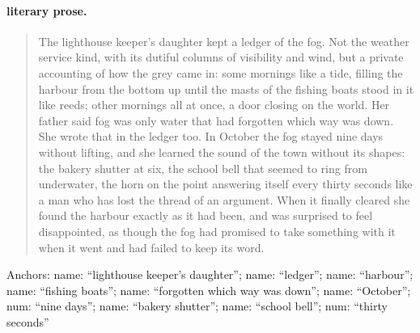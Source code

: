 \paragraph{literary prose.}
\begin{quote}\small The lighthouse keeper's daughter kept a ledger of the fog. Not the weather service kind, with its dutiful columns of visibility and wind, but a private accounting of how the grey came in: some mornings like a tide, filling the harbour from the bottom up until the masts of the fishing boats stood in it like reeds; other mornings all at once, a door closing on the world. Her father said fog was only water that had forgotten which way was down. She wrote that in the ledger too. In October the fog stayed nine days without lifting, and she learned the sound of the town without its shapes: the bakery shutter at six, the school bell that seemed to ring from underwater, the horn on the point answering itself every thirty seconds like a man who has lost the thread of an argument. When it finally cleared she found the harbour exactly as it had been, and was surprised to feel disappointed, as though the fog had promised to take something with it when it went and had failed to keep its word.\end{quote}
\noindent\footnotesize Anchors: name: ``lighthouse keeper's daughter''; name: ``ledger''; name: ``harbour''; name: ``fishing boats''; name: ``forgotten which way was down''; name: ``October''; num: ``nine days''; name: ``bakery shutter''; name: ``school bell''; num: ``thirty seconds''\normalsize
